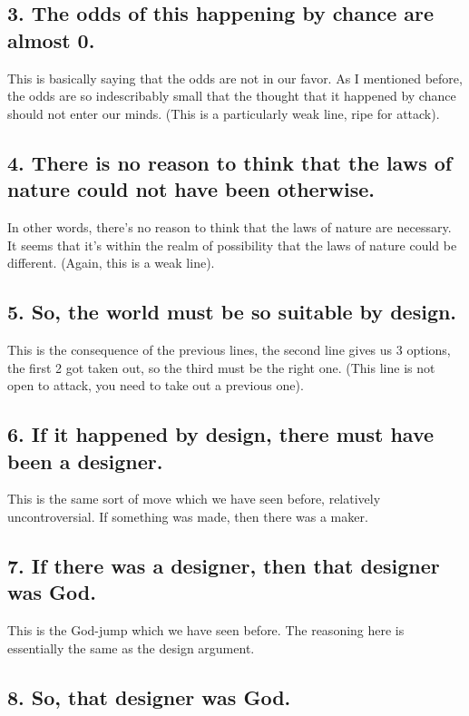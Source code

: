\subsection{3. The odds of this happening by chance are almost 0.}

This is basically saying that the odds are not in our favor. As I mentioned before, the odds are so indescribably small that the thought that it happened by chance should not enter our minds. (This is a particularly weak line, ripe for attack).

\subsection{4. There is no reason to think that the laws of nature could not have been otherwise.}

In other words, there's no reason to think that the laws of nature are necessary. It seems that it's within the realm of possibility that the laws of nature could be different. (Again, this is a weak line).

\subsection{5. So, the world must be so suitable by design.}

This is the consequence of the previous lines, the second line gives us 3 options, the first 2 got taken out, so the third must be the right one. (This line is not open to attack, you need to take out a previous one).

\subsection{6. If it happened by design, there must have been a designer.}

This is the same sort of move which we have seen before, relatively uncontroversial. If something was made, then there was a maker.

\subsection{7. If there was a designer, then that designer was God.}

This is the God-jump which we have seen before. The reasoning here is essentially the same as the design argument. 

\subsection{8. So, that designer was God.}

